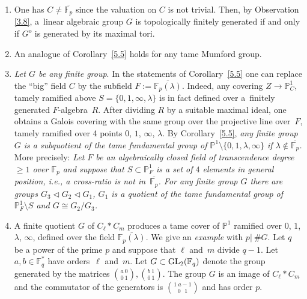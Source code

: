 \documentclass[pdftex]{sigma}
\numberwithin{equation}{section}
\begin{document}
\begin{Observations}\label{5.6}\quad
\begin{enumerate}\itemsep=0pt
\item[(1)] One has $C\neq \overline{\mathbb{F}_p}$ since the valuation on $C$ is not trivial. Then, by Observation \ref{3.8}, a~linear algebraic group $G$ is topologically finitely generated if and only if $G^o$ is generated by its maximal tori.
\item[(2)] An analogue of Corollary~\ref{5.5} holds for any tame Mumford group.
\item[(3)] {\it Let $G$ be any finite group}. In the statements of Corollary~\ref{5.5} one can replace the ``big'' field $C$ by the subfield $F:=\overline{\mathbb{F}_p(\lambda)}$. Indeed, any covering $Z\rightarrow \mathbb{P}_C^1$, tamely ramified above $S=\{0,1,\infty ,\lambda\}$ is in fact defined over a~finitely generated $F$-algebra~$R$. After dividing $R$ by a suitable maximal ideal, one obtains a Galois covering with the same group over the projective line over~$F$, tamely ramified over 4 points $0$, $1$, $\infty$, $\lambda$. By Corollary~\ref{5.5}, {\it any finite group $G$ is a subquotient of the tame fundamental group of $\mathbb{P}^1\setminus \{0,1,\lambda ,\infty \}$ if $\lambda \not \in \overline{\mathbb{F}_p}$.}
More precisely: {\it Let $F$ be an algebraically closed field of transcendence degree $\geq 1$ over $\mathbb{F}_p$ and suppose that $S\subset \mathbb{P}^1_F$ is a set of $4$ elements in general position, i.e., a cross-ratio is not in~$\overline{\mathbb{F}_p}$. For any finite group $G$ there are groups $G_3\lhd G_2\lhd G_1$, $G_1$ is a quotient of the tame fundamental group of $\mathbb{P}^1_F\setminus S$ and $G\cong G_2/G_3$.}

\item[(4)] A finite quotient $G$ of $C_\ell \ast C_m$ produces a tame cover of $\mathbb{P}^1$ ramified over $0$, $1$, $\lambda$, $\infty$, defined over the field $\overline{\mathbb{F}_p(\lambda)}$. We give an {\it example} with $p|\ \#G$. Let $q$ be a power of the prime $p$ and suppose that $\ell$ and~$m$ divide $q-1$. Let $a, b\in \mathbb{F}_q^*$ have orders~$\ell$ and~$m$. Let $G\subset {\rm GL}_2(\mathbb{F}_q)$ denote the group generated by the matrices ${a\ 0\choose 0\ 1},{b\ 1\choose 0\ 1 }$. The group $G$ is an image of $C_\ell \ast C_m$ and the commutator of the generators is ${1\ a-1\choose 0\ \ \ 1 }$ and has order $p$.
\end{enumerate}
\end{Observations}
\end{document}
